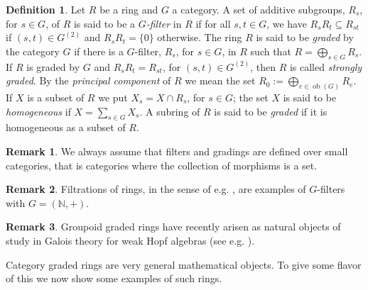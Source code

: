 \documentclass[11pt,leqno]{amsart}
\theoremstyle{plain}
\theoremstyle{definition}
\newtheorem{defn}{Definition}
\newtheorem{rem}{Remark}
\newcommand{\N}{\mathbb{N}}
\DeclareMathOperator{\ob}{ob}
\begin{document}
\begin{defn}\label{defgradedring}
Let $R$ be a ring and $G$ a category.
A set of additive subgroups,
$R_s$, for $s \in G$, of $R$ is said to be a \emph{$G$-filter} in $R$ if for all $s ,t \in G$,
we have $R_s R_t \subseteq R_{st}$ if
$(s,t) \in G^{(2)}$ and
$R_s R_t = \{ 0 \}$ otherwise.
The ring $R$ is said to be \emph{graded} by the category $G$
if there is a $G$-filter,
$R_s$, for $s \in G$, in $R$ such that
$R = \bigoplus_{s \in G} R_s$.
If $R$ is graded by $G$ and
$R_s R_t = R_{st}$, for $(s,t) \in G^{(2)}$,
then $R$ is called \emph{strongly graded}.
By the \emph{principal component} of $R$ we mean
the set $R_0 := \bigoplus_{e \in \ob(G)} R_e$.
If $X$ is a subset of $R$ we put $X_s = X \cap R_s$,
for $s \in G$; the set $X$ is said to be \emph{homogeneous}
if $X = \sum_{s \in G} X_s$.
A subring of $R$ is said to be \emph{graded} if it
is homogeneous as a subset of $R$.
\end{defn}

\begin{rem}
We always assume that filters and gradings are
defined over small categories, that is categories
where the collection of morphisms is a set.
\end{rem}

\begin{rem}
Filtrations of rings, in the sense of e.g. \cite{Lang}, are examples of $G$-filters with
$G=(\N,+)$.
\end{rem}

\begin{rem}
Groupoid graded rings have recently arisen as natural objects
of study in Galois theory for weak Hopf algebras (see e.g. \cite{cae2004}).
\end{rem}

Category graded rings are very general mathematical objects.
To give some flavor of this we now show some examples of such rings.
\end{document}

